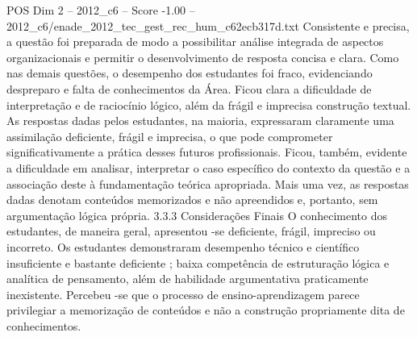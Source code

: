 \begin{textsample}{POS Dim 2 – 2012\_c6 – Score -1.00 – 2012\_c6/enade\_2012\_tec\_gest\_rec\_hum\_c62ecb317d.txt}
Consistente e precisa, a questão foi preparada de modo a possibilitar análise integrada de aspectos organizacionais e permitir o desenvolvimento de resposta concisa e clara.
Como nas demais questões, o desempenho dos estudantes foi fraco, evidenciando despreparo e falta de conhecimentos da Área.
Ficou clara a dificuldade de interpretação e de raciocínio lógico, além da frágil e imprecisa construção textual.
As respostas dadas pelos estudantes, na maioria, expressaram claramente uma assimilação deficiente, frágil e imprecisa, o que pode comprometer significativamente a prática desses futuros profissionais.
Ficou, também, evidente a dificuldade em analisar, interpretar o caso específico do contexto da questão e a associação deste à fundamentação teórica apropriada.
Mais uma vez, as respostas dadas denotam conteúdos memorizados e não apreendidos e, portanto, sem argumentação lógica própria. 3.3.3 Considerações Finais O conhecimento dos estudantes, de maneira geral, apresentou -se deficiente, frágil, impreciso ou incorreto.
Os estudantes demonstraram desempenho técnico e científico insuficiente e bastante deficiente ; baixa competência de estruturação lógica e analítica de pensamento, além de habilidade argumentativa praticamente inexistente.
Percebeu -se que o processo de ensino-aprendizagem parece privilegiar a memorização de conteúdos e não a construção propriamente dita de conhecimentos.

\end{textsample}
